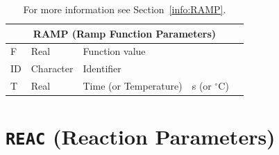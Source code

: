 \documentclass[11pt]{book}
\begin{document}
\hspace{1in}

\begin{table}[H]
\caption{For more information see Section~\ref{info:RAMP}.}\label{tbl:RAMP}
\noindent
\begin{tabular*}{\textwidth}{@{\extracolsep{\fill}}|l|l|l|l|l|}
\hline
\multicolumn{5}{|c|}{{\ct RAMP} (Ramp Function Parameters)} \\ \hline \hline
{\ct F}         & Real          & Function value        &                       &     \\ \hline
{\ct ID}        & Character     & Identifier            &                       &     \\ \hline
{\ct T}         & Real          & Time (or Temperature) & s (or $^\circ$C)      &     \\ \hline
\end{tabular*}
\end{table}

\vspace{\baselineskip}

\vfill

\section{\texorpdfstring{{\tt REAC}}{REAC} (Reaction Parameters)}

\hspace{1in}
\end{document}
